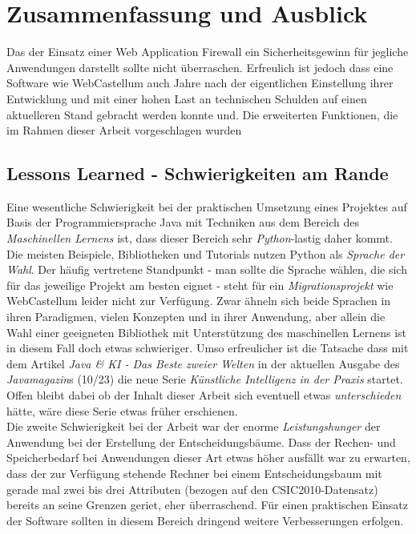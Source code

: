 \chapter{Zusammenfassung und Ausblick}



Das der Einsatz einer Web Application Firewall ein Sicherheitsgewinn für jegliche Anwendungen darstellt sollte nicht überraschen. Erfreulich ist jedoch dass eine Software wie WebCastellum auch Jahre nach der eigentlichen Einstellung ihrer Entwicklung und mit einer hohen Last an technischen Schulden auf einen aktuelleren Stand gebracht werden konnte und. Die erweiterten Funktionen, die im Rahmen dieser Arbeit vorgeschlagen wurden

\section{Lessons Learned - Schwierigkeiten am Rande}
Eine wesentliche Schwierigkeit bei der praktischen Umsetzung eines Projektes auf Basis der Programmiersprache Java mit Techniken aus dem Bereich des \emph{Maschinellen Lernens} ist, dass dieser Bereich sehr \glqq\emph{Python}\grqq-lastig daher kommt. Die meisten Beispiele, Bibliotheken und Tutorials nutzen Python als \emph{Sprache der Wahl}. Der häufig vertretene Standpunkt - man sollte die Sprache wählen, die sich für das jeweilige Projekt am besten eignet - steht für ein \emph{Migrationsprojekt} wie WebCastellum leider nicht zur Verfügung. Zwar ähneln sich beide Sprachen in ihren Paradigmen, vielen Konzepten und in ihrer Anwendung, aber allein die Wahl einer geeigneten Bibliothek mit Unterstützung des maschinellen Lernens ist in diesem Fall doch etwas schwieriger. Umso erfreulicher ist die Tatsache dass mit dem Artikel \glqq\emph{Java \& KI - Das Beste zweier Welten}\grqq{} in der aktuellen Ausgabe des \emph{Javamagazin}s (10/23) die neue Serie \glqq\emph{Künstliche Intelligenz in der Praxis}\grqq{} startet. Offen bleibt dabei ob der Inhalt dieser Arbeit sich eventuell etwas \emph{unterschieden} hätte, wäre diese Serie etwas früher erschienen.\\

Die zweite Schwierigkeit bei der Arbeit war der enorme \emph{Leistungshunger} der Anwendung bei der Erstellung der Entscheidungsbäume. Dass der Rechen- und Speicherbedarf bei Anwendungen dieser Art etwas höher ausfällt war zu erwarten, dass der zur Verfügung stehende Rechner bei einem Entscheidungsbaum mit gerade mal zwei bis drei Attributen (bezogen auf den CSIC2010-Datensatz) bereits an seine Grenzen geriet, eher überraschend. Für einen praktischen Einsatz der Software sollten in diesem Bereich dringend weitere Verbesserungen erfolgen.\\





